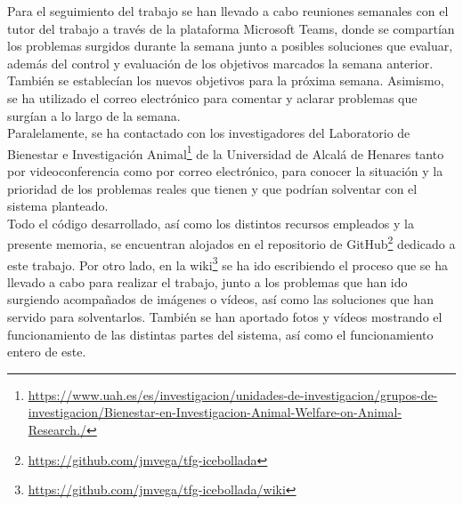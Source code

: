Para el seguimiento del trabajo se han llevado a cabo reuniones semanales con el tutor del trabajo a través de la plataforma Microsoft Teams, donde se compartían los problemas surgidos durante la semana junto a posibles soluciones que evaluar, además del control y evaluación de los objetivos marcados la semana anterior. También se establecían los nuevos objetivos para la próxima semana. Asimismo, se ha utilizado el correo electrónico para comentar y aclarar problemas que surgían a lo largo de la semana.\\

Paralelamente, se ha contactado con los investigadores del Laboratorio de Bienestar e Investigación Animal\footnote{\url{https://www.uah.es/es/investigacion/unidades-de-investigacion/grupos-de-investigacion/Bienestar-en-Investigacion-Animal-Welfare-on-Animal-Research./}} de la Universidad de Alcalá de Henares tanto por videoconferencia como por correo electrónico, para conocer la situación y la prioridad de los problemas reales que tienen y que podrían solventar con el sistema planteado.\\

Todo el código desarrollado, así como los distintos recursos empleados y la presente memoria, se encuentran alojados en el repositorio de GitHub\footnote{\url{https://github.com/jmvega/tfg-icebollada}} dedicado a este trabajo. Por otro lado, en la wiki\footnote{\url{https://github.com/jmvega/tfg-icebollada/wiki}} se ha ido escribiendo el proceso que se ha llevado a cabo para realizar el trabajo, junto a los problemas que han ido surgiendo acompañados de imágenes o vídeos, así como las soluciones que han servido para solventarlos. También se han aportado fotos y vídeos mostrando el funcionamiento de las distintas partes del sistema, así como el funcionamiento entero de este.
